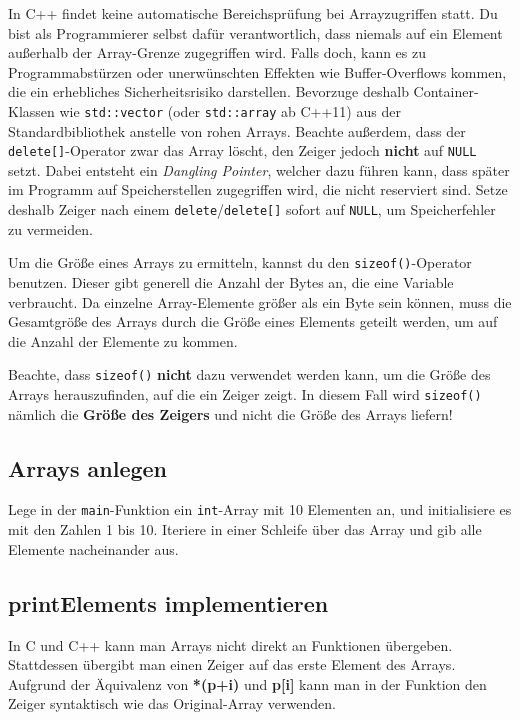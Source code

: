 In C++ findet keine automatische Bereichsprüfung bei Arrayzugriffen statt.
Du bist als Programmierer selbst dafür verantwortlich, dass niemals auf ein Element außerhalb der Array-Grenze zugegriffen wird.
Falls doch, kann es zu Programmabstürzen oder unerwünschten Effekten wie Buffer-Overflows kommen, die ein erhebliches Sicherheitsrisiko darstellen.
Bevorzuge deshalb Container-Klassen wie \lstinline{std::vector} (oder \lstinline{std::array} ab C++11) aus der Standardbibliothek anstelle von \glqq rohen\grqq{} Arrays.
Beachte außerdem, dass der \lstinline{delete[]}-Operator zwar das Array löscht, den Zeiger jedoch \textbf{nicht} auf \lstinline{NULL} setzt.
Dabei entsteht ein \emph{Dangling Pointer}, welcher dazu führen kann, dass später im Programm auf Speicherstellen zugegriffen wird, die nicht reserviert sind.
Setze deshalb Zeiger nach einem \lstinline{delete}/\lstinline{delete[]} sofort auf \lstinline{NULL}, um Speicherfehler zu vermeiden.

Um die Größe eines Arrays zu ermitteln, kannst du den \lstinline{sizeof()}-Operator benutzen.
Dieser gibt generell die Anzahl der Bytes an, die eine Variable verbraucht.
Da einzelne Array-Elemente größer als ein Byte sein können, muss die Gesamtgröße des Arrays durch die Größe eines Elements geteilt werden, um auf die Anzahl der Elemente zu kommen.



Beachte, dass \lstinline{sizeof()} \textbf{nicht} dazu verwendet werden kann, um die Größe des Arrays herauszufinden, auf die ein Zeiger zeigt.
In diesem Fall wird \lstinline{sizeof()} nämlich die \textbf{Größe des Zeigers} und nicht die Größe des Arrays liefern!



\subsection{Arrays anlegen}
Lege in der \lstinline{main}-Funktion ein \lstinline{int}-Array mit 10 Elementen an, und initialisiere es mit den Zahlen 1 bis 10.
Iteriere in einer Schleife über das Array und gib alle Elemente nacheinander aus.

\subsection{printElements implementieren}
In C und C++ kann man Arrays nicht direkt an Funktionen übergeben.
Stattdessen übergibt man einen Zeiger auf das erste Element des Arrays. Aufgrund der Äquivalenz von \textbf{*(p+i) } und \textbf{p[i]} kann man in der Funktion den Zeiger syntaktisch wie das Original-Array verwenden.

